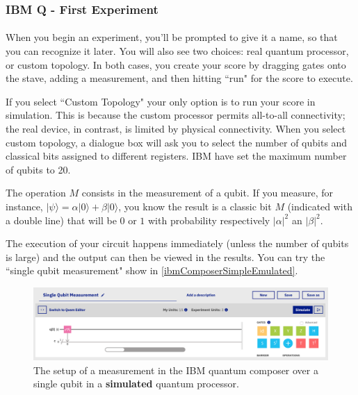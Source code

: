 \documentclass[a4paper,10pt]{article}
\begin{document}
\subsubsection{IBM Q - First Experiment} 

\paragraph{} When you begin an experiment, you'll be prompted to give it a name, so that you can recognize it later. You will also see two choices: real quantum processor, or custom topology.  In both cases, you create your score by dragging gates onto the stave, adding a measurement, and then hitting ``run" for the score to execute.

If you select ``Custom Topology" your only option is to run your score in simulation. This is because the custom processor permits all-to-all connectivity; the real device, in contrast, is limited by physical connectivity. When you select custom topology, a dialogue box will ask you to select the number of qubits and classical bits assigned to different registers. IBM have set the maximum number of qubits to 20.

The operation $M$ consists in the measurement of a qubit. If you measure, for instance, $|\psi\rangle = \alpha|0\rangle + \beta|0\rangle$, you know the result is a classic bit $M$ (indicated with a double line) that will be $0$ or $1$ with probability respectively ${|\alpha|}^2$ an ${|\beta|}^2$.

The execution of your circuit happens immediately (unless the number of qubits is large) and the output can then be viewed in the results. You can try the ``single qubit measurement" show in \autoref{ibmComposerSimpleEmulated}.

\begin{figure}[!htb]
\begin{center}
\includegraphics[width=4.7in]{images/ibmComposerSimpleEmulated.png}
\caption{The setup of a measurement in the IBM quantum composer over a single qubit in a \textbf{simulated} quantum processor.}
\label{ibmComposerSimpleEmulated}
\end{center}
\end{figure}
\end{document}

